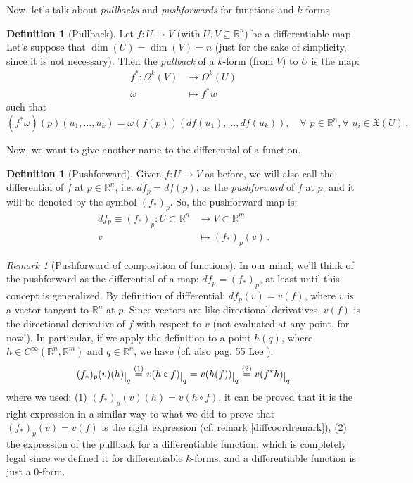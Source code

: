 \documentclass[a4paper,11pt,titlepage, article, oneside]{memoir}
\numberwithin{equation}{section}
\theoremstyle{definition}
\newtheorem{definition}[theorem]{Definition}
\theoremstyle{remark}
\newtheorem{remark}[theorem]{Remark}
\newcommand{\rfield}{\mathbb{R}}
\newcommand{\restrict}[2]{{#1}\raisebox{-.5ex}{$|$}_{#2}}
\begin{document}
Now, let's talk about \textit{pullbacks} and \textit{pushforwards} for functions and $k$-forms.

\begin{definition}[Pullback]
  Let $f \colon U \rightarrow V$ (with $U, V \subseteq \rfield^n$) be a differentiable map. Let's suppose that $\dim(U) = \dim(V) = n$ (just for the sake of simplicity, since it is not necessary). Then the \textit{pullback} of a $k$-form (from $V$) to $U$ is the map:
  \begin{align*} \label{pullbackdef}
    f^* \colon \Omega^k(V) & \rightarrow \Omega^k(U) \\
    \omega & \mapsto f^*w
  \end{align*}
  such that
  \begin{equation*}
    (f^* \omega)(p) (u_1, \ldots, u_k) = \omega (f(p)) (df(u_1), \ldots, df(u_k)), \quad \forall\, \, p \in \rfield^n, \forall \,\, u_i \in \mathfrak{X}(U) \, .
  \end{equation*}
\end{definition}

Now, we want to give another name to the differential of a function.
\begin{definition}[Pushforward]
  Given $f \colon U \rightarrow V$ as before, we will also call the differential of $f$ at $p \in \rfield^n$, i.e. $df_p = df(p)$, as the \textit{pushforward} of $f$ at $p$, and it will be denoted by the symbol $(f_*)_p$.
  So, the pushforward map is:
\begin{align*}
  df_p \equiv (f_*)_p \colon U \subset \rfield^n &\rightarrow V \subset \rfield^m \\
    v & \mapsto (f_*)_p (v) \, .
\end{align*}
\end{definition}

\begin{remarkbox}\begin{remark}[Pushforward of composition of functions] \label{pushfcomposition}
In our mind, we'll think of the pushforward as the differential of a map: $df_p = (f_*)_p$, at least until this concept is generalized.
By definition of differential: $df_p(v) = v(f)$, where $v$ is a vector tangent to $\rfield^n$ at $p$. Since vectors are like directional derivatives, $v(f)$ is the directional derivative of $f$ with respect to $v$ (not evaluated at any point, for now!). In particular, if we apply the definition to a point $h(q)$, where $h \in C^{\infty}(\rfield^n, \rfield^m)$ and $q \in \rfield^n$, we have (cf. also pag. 55 Lee ):
$$\restrict{(f_*)_p (v)(h)}{q} \overset{(1)}{=} \restrict{v(h \circ f)}{q}  = \restrict{v(h(f))}{q} \overset{(2)}{=} \restrict{v (f^* h) }{q}$$
where we used: (1) $(f_*)_p (v)(h)  = v(h \circ f)$, it can be proved that it is the right expression in a similar way to what we did to prove that $(f_*)_p (v)= v(f)$ is the right expression (cf. remark \ref{diffcoordremark}), (2) the expression of the pullback for a differentiable function, which is completely legal since we defined it for differentiable $k$-forms, and a differentiable function is just a 0-form.
\end{remark}\end{remarkbox}
\end{document}
